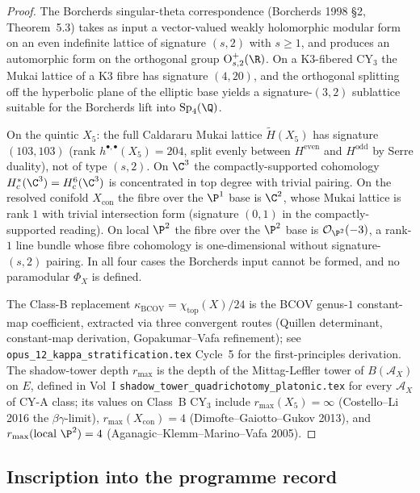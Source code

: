 \begin{proof}
The Borcherds singular-theta correspondence (Borcherds 1998
\S 2, Theorem~5.3) takes as input a vector-valued weakly
holomorphic modular form on an even indefinite lattice of
signature $(s, 2)$ with $s \geq 1$, and produces an automorphic
form on the orthogonal group $\mathrm{O}^+_{s, 2}(\R)$. On a
K3-fibered CY$_3$ the Mukai lattice of a K3 fibre has signature
$(4, 20)$, and the orthogonal splitting off the hyperbolic
plane of the elliptic base yields a signature-$(3, 2)$
sublattice suitable for the Borcherds lift into
$\mathrm{Sp}_4(\Q)$.

On the quintic $X_5$: the full Caldararu Mukai lattice
$\widetilde{H}(X_5)$ has signature $(103, 103)$ (rank
$h^{\bullet, \bullet}(X_5) = 204$, split evenly between
$H^{\mathrm{even}}$ and $H^{\mathrm{odd}}$ by Serre duality),
not of type $(s, 2)$. On $\C^3$ the compactly-supported
cohomology $H^*_c(\C^3) = H^6_c(\C^3)$ is concentrated in top
degree with trivial pairing. On the resolved conifold
$X_{\mathrm{con}}$ the fibre over the $\P^1$ base is $\C^2$,
whose Mukai lattice is rank $1$ with trivial intersection form
(signature $(0, 1)$ in the compactly-supported reading). On
local $\P^2$ the fibre over the $\P^2$ base is
$\mathcal{O}_{\P^2}(-3)$, a rank-$1$ line bundle whose fibre
cohomology is one-dimensional without signature-$(s, 2)$
pairing. In all four cases the Borcherds input cannot be
formed, and no paramodular $\Phi_X$ is defined.

The Class-B replacement $\kappa_{\mathrm{BCOV}} =
\chi_{\mathrm{top}}(X)/24$ is the BCOV genus-$1$ constant-map
coefficient, extracted via three convergent routes (Quillen
determinant, constant-map derivation, Gopakumar--Vafa
refinement); see \texttt{opus\_12\_kappa\_stratification.tex}
Cycle~5 for the first-principles derivation. The shadow-tower
depth $r_{\max}$ is the depth of the Mittag-Leffler tower of
$B(\mathcal{A}_X)$ on $E$, defined in Vol~I
\texttt{shadow\_tower\_quadrichotomy\_platonic.tex} for every
$\mathcal{A}_X$ of CY-A class; its values on Class~B CY$_3$
include $r_{\max}(X_5) = \infty$ (Costello--Li 2016 the
$\beta\gamma$-limit), $r_{\max}(X_{\mathrm{con}}) = 4$
(Dimofte--Gaiotto--Gukov 2013), and $r_{\max}(\text{local
}\P^2) = 4$ (Aganagic--Klemm--Marino--Vafa 2005).
\end{proof}

\subsection*{Inscription into the programme record}

